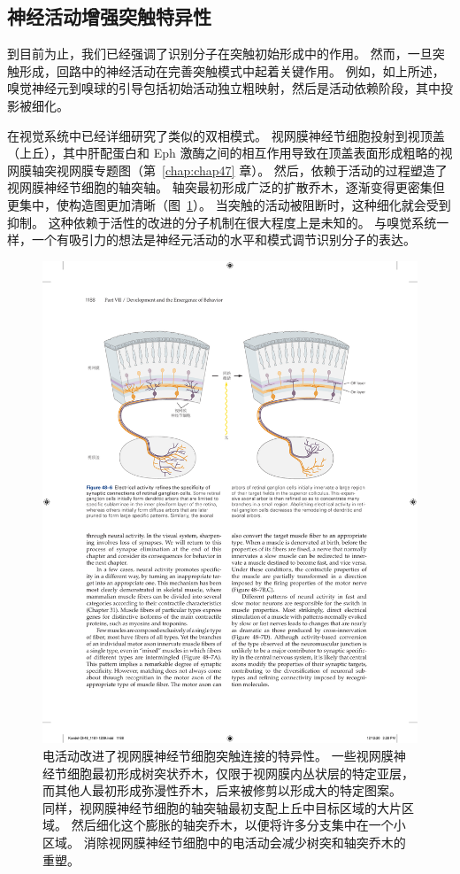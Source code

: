 \subsection{神经活动增强突触特异性}


到目前为止，我们已经强调了识别分子在突触初始形成中的作用。
然而，一旦突触形成，回路中的神经活动在完善突触模式中起着关键作用。
例如，如上所述，嗅觉神经元到嗅球的引导包括初始活动独立粗映射，然后是活动依赖阶段，其中投影被细化。


在视觉系统中已经详细研究了类似的双相模式。
视网膜神经节细胞投射到视顶盖（上丘），其中肝配蛋白和 Eph 激酶之间的相互作用导致在顶盖表面形成粗略的视网膜轴突视网膜专题图（第~\ref{chap:chap47} 章）。
然后，依赖于活动的过程塑造了视网膜神经节细胞的轴突轴。
轴突最初形成广泛的扩散乔木，逐渐变得更密集但更集中，使构造图更加清晰（图~\ref{fig:48_6}）。
当突触的活动被阻断时，这种细化就会受到抑制。
这种依赖于活性的改进的分子机制在很大程度上是未知的。
与嗅觉系统一样，一个有吸引力的想法是神经元活动的水平和模式调节识别分子的表达。


\begin{figure}[htbp]
	\centering
	\includegraphics[width=0.9\linewidth]{chap48/fig_48_6}
	\caption{电活动改进了视网膜神经节细胞突触连接的特异性。
		一些视网膜神经节细胞最初形成树突状乔木，仅限于视网膜内丛状层的特定亚层，而其他人最初形成弥漫性乔木，后来被修剪以形成大的特定图案。
		同样，视网膜神经节细胞的轴突轴最初支配上丘中目标区域的大片区域。
		然后细化这个膨胀的轴突乔木，以便将许多分支集中在一个小区域。
		消除视网膜神经节细胞中的电活动会减少树突和轴突乔木的重塑。}
	\label{fig:48_6}
\end{figure}


